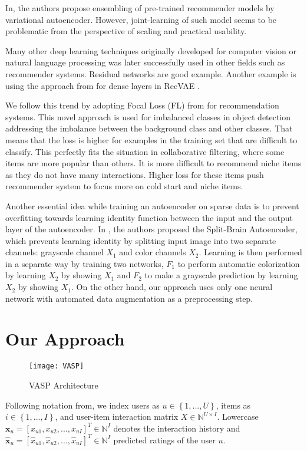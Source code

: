 \documentclass[conference]{IEEEtran}
\begin{document}
        In\cite{drif2020ensvae}, the authors propose ensembling of pre-trained recommender models by variational autoencoder. However, joint-learning of such model seems to be problematic from the perspective of scaling and practical usability.
        
        Many other deep learning techniques originally developed for computer vision or natural language processing was later successfully used in other fields such as recommender systems. Residual networks \cite{He2016} are good example. Another example is using the approach from \cite{Huang2017} for dense layers in RecVAE \cite{Shenbin2020}.

        We follow this trend by adopting Focal Loss (FL) from \cite{Lin2020} for recommendation systems. This novel approach is used for imbalanced classes in object detection addressing the imbalance between the background class and other classes. That means that the loss is higher for examples in the training set that are difficult to classify. This perfectly fits the situation in collaborative filtering, where some items are more popular than others. It is more difficult to recommend niche items as they do not have many interactions. Higher loss for these items push recommender system to focus more on cold start and niche items. 

        Another essential idea while training an autoencoder on sparse data is to prevent overfitting towards learning identity function between the input and the output layer of the autoencoder\cite{Steck2020}. In \cite{zhang2017split}, the authors proposed the Split-Brain Autoencoder, which prevents learning identity by splitting input image into two separate channels: grayscale channel \(X_1\) and color channels \(X_2\). Learning is then performed in a separate way by training two networks, \(F_1\) to perform automatic colorization by learning \(X_2\) by showing \(X_1\) and \(F_2\) to make a grayscale prediction by learning \(X_2\) by showing \(X_1\).
        On the other hand, our approach uses only one neural network with automated data augmentation as a preprocessing step. 

        
\section{Our Approach}
        \begin{figure}
            \centering 
            \texttt{[image: VASP]} 
            \caption{VASP Architecture}
            \label{fig:vasp}
        \end{figure}  
    Following notation from\cite{Liang2018}, we index users as \(u\in\left\{1,...,U\right\}\), items as \(i\in\left\{1,...,I\right\}\), and user-item interaction matrix \(X \in \mathbb{N}^{U \times I}\). Lowercase \(\mathbf{x}_u=\left[ x_{u1}, x_{u2}, ... , x_{uI}  \right]^T \in \mathbb{N}^I\) denotes the interaction history and \(\mathbf{\hat{x}}_u=\left[ \hat{x}_{u1}, \hat{x}_{u2}, ... , \hat{x}_{uI}  \right]^T \in \mathbb{N}^I\) predicted ratings of the user \(u\).
    
\end{document}
